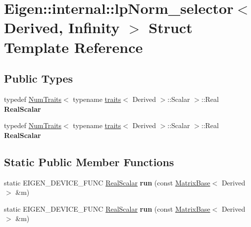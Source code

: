 \hypertarget{struct_eigen_1_1internal_1_1lp_norm__selector_3_01_derived_00_01_infinity_01_4}{}\section{Eigen\+:\+:internal\+:\+:lp\+Norm\+\_\+selector$<$ Derived, Infinity $>$ Struct Template Reference}
\label{struct_eigen_1_1internal_1_1lp_norm__selector_3_01_derived_00_01_infinity_01_4}
\subsection*{Public Types}
\begin{DoxyCompactItemize}
\item 
\mbox{\label{struct_eigen_1_1internal_1_1lp_norm__selector_3_01_derived_00_01_infinity_01_4_ad0a33c31e969d5226e28242d657decd6}} 
typedef \hyperlink{group___core___module_struct_eigen_1_1_num_traits}{Num\+Traits}$<$ typename \hyperlink{struct_eigen_1_1internal_1_1traits}{traits}$<$ Derived $>$\+::Scalar $>$\+::Real {\bfseries Real\+Scalar}
\item 
\mbox{\label{struct_eigen_1_1internal_1_1lp_norm__selector_3_01_derived_00_01_infinity_01_4_ad0a33c31e969d5226e28242d657decd6}} 
typedef \hyperlink{group___core___module_struct_eigen_1_1_num_traits}{Num\+Traits}$<$ typename \hyperlink{struct_eigen_1_1internal_1_1traits}{traits}$<$ Derived $>$\+::Scalar $>$\+::Real {\bfseries Real\+Scalar}
\end{DoxyCompactItemize}
\subsection*{Static Public Member Functions}
\begin{DoxyCompactItemize}
\item 
\mbox{\label{struct_eigen_1_1internal_1_1lp_norm__selector_3_01_derived_00_01_infinity_01_4_a80aeefb51897e03ff09bdaf97998ab26}} 
static E\+I\+G\+E\+N\+\_\+\+D\+E\+V\+I\+C\+E\+\_\+\+F\+U\+NC \hyperlink{group___sparse_core___module}{Real\+Scalar} {\bfseries run} (const \hyperlink{group___core___module_class_eigen_1_1_matrix_base}{Matrix\+Base}$<$ Derived $>$ \&m)
\item 
\mbox{\label{struct_eigen_1_1internal_1_1lp_norm__selector_3_01_derived_00_01_infinity_01_4_a80aeefb51897e03ff09bdaf97998ab26}} 
static E\+I\+G\+E\+N\+\_\+\+D\+E\+V\+I\+C\+E\+\_\+\+F\+U\+NC \hyperlink{group___sparse_core___module}{Real\+Scalar} {\bfseries run} (const \hyperlink{group___core___module_class_eigen_1_1_matrix_base}{Matrix\+Base}$<$ Derived $>$ \&m)
\end{DoxyCompactItemize}


